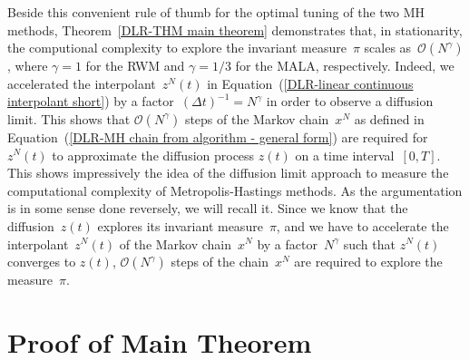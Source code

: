 Beside this convenient rule of thumb for the optimal tuning of the two MH methods, Theorem~\ref{DLR-THM main theorem} demonstrates that, in stationarity, the computional complexity to explore the invariant measure~$\pi$ scales as~$\mathcal{O}(N^{\gamma})$, where $\gamma=1$ for the RWM and $\gamma=1/3$ for the MALA, respectively. Indeed, we accelerated the interpolant~$z^N(t)$ in Equation~(\ref{DLR-linear continuous interpolant short}) by a factor~$(\Delta t)^{-1} = N^{\gamma}$ in order to observe a diffusion limit. This shows that $\mathcal{O}(N^{\gamma})$ steps of the Markov chain~$x^N$ as defined in Equation~(\ref{DLR-MH chain from algorithm - general form}) are required for $z^N(t)$ to approximate the diffusion process $z(t)$ on a time interval~$[0,T]$. This shows impressively the idea of the diffusion limit approach to measure the computational complexity of Metropolis-Hastings methods. As the argumentation is in some sense done reversely, we will recall it. Since we know that the diffusion~$z(t)$ explores its invariant measure~$\pi$, and we have to accelerate the interpolant~$z^N(t)$ of the Markov chain~$x^N$ by a factor~$N^{\gamma}$ such that $z^N(t)$ converges to $z(t)$, $\mathcal{O}(N^{\gamma})$ steps of the chain~$x^N$ are required to explore the measure~$\pi$.


\section{Proof of Main Theorem}
\label{sec:DLR-Proof}

